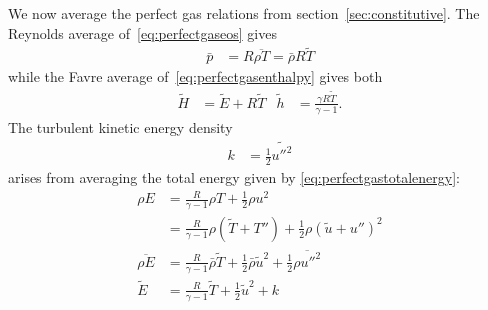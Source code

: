 \documentclass[letterpaper,11pt,nointlimits,reqno,draft]{amsbook}
\begin{document}
We now average the perfect gas relations from section~\ref{sec:constitutive}.
The Reynolds average of~\eqref{eq:perfectgaseos} gives
\begin{align}
  \bar{p} &= R\overline{\rho{}T} = \bar{\rho}R\tilde{T}
\end{align}
while the Favre average of~\eqref{eq:perfectgasenthalpy} gives both
\begin{align}
 \tilde{H} &= \tilde{E} + R \tilde{T}
&
 \tilde{h} &= \frac{\gamma{}R\tilde{T}}{\gamma-1}.
\end{align}
The turbulent kinetic energy density
\begin{align}
  k &= \frac{1}{2}\widetilde{{u''}^2}
 \end{align}
arises from averaging the total energy given by
\eqref{eq:perfectgastotalenergy}:
\begin{align}
  \rho{} E
&=
  \frac{R}{\gamma-1} \rho{}T + \frac{1}{2}\rho{} u^{2}
\\
&=
  \frac{R}{\gamma-1} \rho{}\left( \tilde{T} + T'' \right)
+ \frac{1}{2}\rho{} \left( \tilde{u} + u'' \right)^2
\\
  \overline{\rho{}E}
&=
  \frac{R}{\gamma-1} \bar{\rho} \tilde{T}
+ \frac{1}{2}\bar{\rho} \tilde{u}^2
+ \frac{1}{2}\overline{\rho{}{u''}^2}
\\
  \tilde{E}
&=
  \frac{R}{\gamma-1} \tilde{T}
+ \frac{1}{2} \tilde{u}^2
+ k
\end{align}
\end{document}
